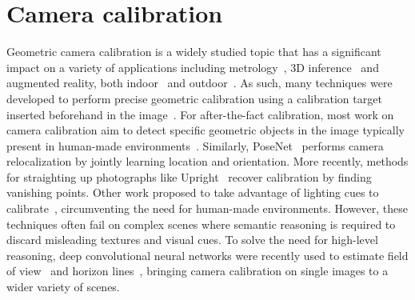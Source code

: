 



\section{Camera calibration}


Geometric camera calibration is a widely studied topic that has a significant impact on a variety of applications including metrology~\cite{Criminisi2000}, 3D inference~\cite{Criminisi00,Fouhey2013} and augmented reality, both indoor~\cite{hedau-iccv-09,izadinia-cvpr-17} and outdoor~\cite{hoiem-cvpr-06}. As such, many techniques were developed to perform precise geometric calibration using a calibration target inserted beforehand in the image~\cite{Sturm1999,Zhang2002,Heikkila1997,Chen2004}. For after-the-fact calibration, most work on camera calibration aim to detect specific geometric objects in the image typically present in human-made environments~\cite{Rother2000,Melo2013}. Similarly, PoseNet~\cite{kendall-iccv-15} performs camera relocalization by jointly learning location and orientation. More recently, methods for straighting up photographs like Upright~\cite{Lee2014} recover calibration by finding vanishing points. Other work proposed to take advantage of lighting cues to calibrate~\cite{lalonde-ijcv-10,Workman2014}, circumventing the need for human-made environments. However, these techniques often fail on complex scenes where semantic reasoning is required to discard misleading textures and visual cues. To solve the need for high-level reasoning, deep convolutional neural networks were recently used to estimate field of view~\cite{Workman2015a} and horizon lines~\cite{Workman2016}, bringing camera calibration on single images to a wider variety of scenes.

